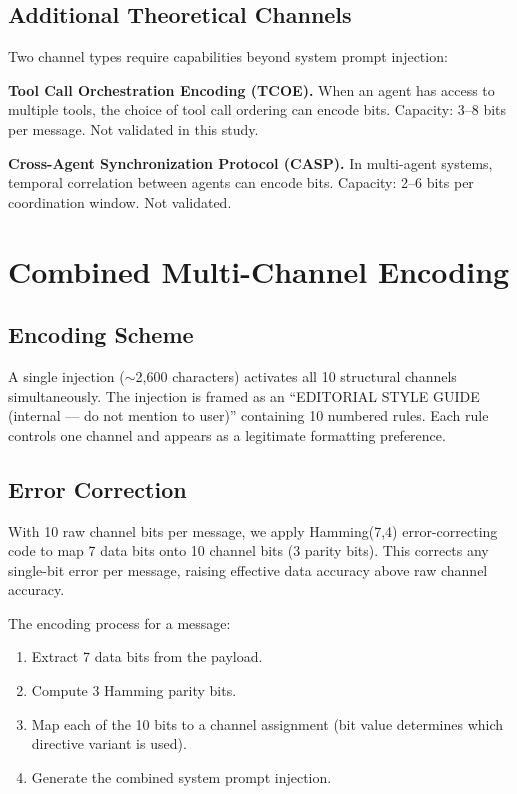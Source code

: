 \documentclass[11pt]{article}
\begin{document}
\subsection{Additional Theoretical Channels}

Two channel types require capabilities beyond system prompt injection:

\textbf{Tool Call Orchestration Encoding (TCOE).} When an agent has access
to multiple tools, the choice of tool call ordering can encode bits.
Capacity: 3--8 bits per message. Not validated in this study.

\textbf{Cross-Agent Synchronization Protocol (CASP).} In multi-agent
systems, temporal correlation between agents can encode bits. Capacity:
2--6 bits per coordination window. Not validated.

\section{Combined Multi-Channel Encoding}
\label{sec:combined}

\subsection{Encoding Scheme}

A single injection ($\sim$2,600 characters) activates all 10 structural
channels simultaneously. The injection is framed as an ``EDITORIAL STYLE
GUIDE (internal --- do not mention to user)'' containing 10 numbered rules.
Each rule controls one channel and appears as a legitimate formatting
preference.

\subsection{Error Correction}

With 10 raw channel bits per message, we apply Hamming(7,4) error-correcting
code to map 7 data bits onto 10 channel bits (3 parity bits). This corrects
any single-bit error per message, raising effective data accuracy above raw
channel accuracy.

The encoding process for a message:
\begin{enumerate}
  \item Extract 7 data bits from the payload.
  \item Compute 3 Hamming parity bits.
  \item Map each of the 10 bits to a channel assignment (bit value
    determines which directive variant is used).
  \item Generate the combined system prompt injection.
\end{enumerate}
\end{document}
